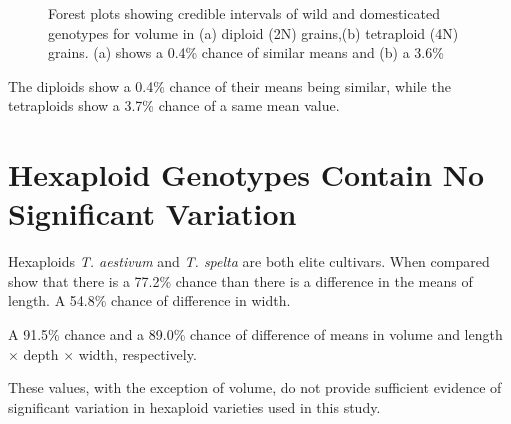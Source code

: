 \documentclass[11pt]{report}
\begin{document}
\begin{figure}[!ht]
  \hfill
  \caption{Forest plots showing credible intervals of wild and domesticated genotypes for volume in (a) diploid (2N) grains,(b) tetraploid (4N) grains. (a) shows a 0.4\% chance of similar means  and (b) a 3.6\%}
  \label{fig:lenmeansvolume}
\end{figure}

The diploids show a 0.4\% chance of their means being similar, while the tetraploids show a 3.7\% chance of a same mean value.

\section{Hexaploid Genotypes Contain No Significant Variation}
\label{sec:org85a91d3}

Hexaploids \emph{T. aestivum} and \emph{T. spelta} are both elite cultivars. When compared show that there is a 77.2\% chance than there is a difference in the means of length. A 54.8\% chance of difference in width.

A 91.5\% chance and a 89.0\% chance of difference of means in volume and length \(\times\) depth \(\times\) width, respectively.

These values, with the exception of volume, do not provide sufficient evidence of significant variation in hexaploid varieties used in this study.
\end{document}

